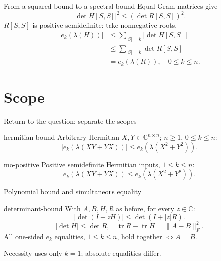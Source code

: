 \documentclass{beamer}
\begin{document}
\begin{frame}{From a squared bound to a spectral bound}
Equal Gram matrices give
\[
|\det H[S,S]|^2\leq(\det R[S,S])^2.
\]
$R[S,S]$ is positive semidefinite: take nonnegative roots.
\begin{align*}
|e_k(\lambda(H))|&\leq\sum_{|S|=k}|\det H[S,S]|\\
&\leq\sum_{|S|=k}\det R[S,S]\\
&=e_k(\lambda(R)),\quad 0\leq k\leq n.
\end{align*}
\end{frame}
\section{Scope}
\begin{frame}{Return to the question; separate the scopes}
\begin{bookresult}{hermitian-bound}
Arbitrary Hermitian $X,Y\in\mathbb C^{n\times n}$; $n\geq1$, $0\leq k\leq n$:
\[
|e_k(\lambda(XY+YX))|\leq e_k(\lambda(X^2+Y^2)).
\]
\end{bookresult}
\begin{bookresult}{mo-positive}
Positive semidefinite Hermitian inputs, $1\leq k\leq n$:
\[
e_k(\lambda(XY+YX))\leq e_k(\lambda(X^2+Y^2)).
\]
\end{bookresult}
\end{frame}
\begin{frame}{Polynomial bound and simultaneous equality}
\begin{bookresult}{determinant-bound}
With $A,B,H,R$ as before, for every $z\in\mathbb C$:
\[
|\det(I+zH)|\leq\det(I+|z|R).
\]
\[
|\det H|\leq\det R,\quad
\operatorname{tr}R-\operatorname{tr}H=\|A-B\|_F^2.
\]
All one-sided $e_k$ equalities, $1\leq k\leq n$, hold together
$\Longleftrightarrow A=B$.
\end{bookresult}
Necessity uses only $k=1$; absolute equalities differ.
\end{frame}
\end{document}
